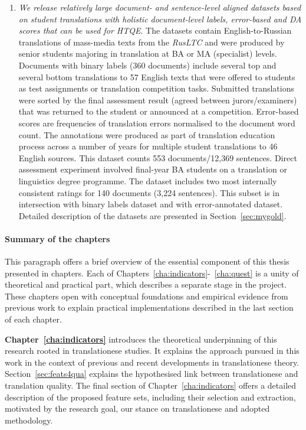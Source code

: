 \begin{enumerate}
	\item \textit{We release relatively large document- and sentence-level aligned datasets based on student translations with holistic document-level labels, error-based and DA scores that can be used for \gls{HTQE}}.
	The datasets contain English-to-Russian translations of mass-media texts from the \textit{RusLTC} and were produced by senior students majoring in translation at BA or MA (specialist) levels. 
	Documents with binary labels (360 documents) include several top and several bottom translations to 57 English texts that were offered to students as test assignments or translation competition tasks. Submitted translations were sorted by the final assessment result (agreed between jurors/examiners) that was returned to the student or announced at a competition.
	Error-based scores are frequencies of translation errors normalised to the document word count. The annotations were produced as part of translation education process across a number of years for multiple student translations to 46 English sources. This dataset counts 553 documents/12,369 sentences.
	Direct assessment experiment involved final-year BA students on a translation or linguistics degree programme. The dataset includes two most internally consistent ratings for 140 documents (3,224 sentences). This subset is in intersection with binary labels dataset and with error-annotated dataset.
	Detailed description of the datasets are presented in Section~\ref{sec:mygold}.
	
\end{enumerate}

\paragraph{Summary of the chapters}
This paragraph offers a brief overview of the essential component of this thesis presented in chapters.
Each of Chapters~\ref{cha:indicators}-~\ref{cha:quest} is a unity of theoretical and practical part, which describes a separate stage in the project. These chapters open with conceptual foundations and empirical evidence from previous work to explain practical implementations described in the last section of each chapter. 

\textbf{Chapter~\ref{cha:indicators}} introduces the theoretical underpinning of this research rooted in translationese studies. It explains the approach pursued in this work in the context of previous and recent developments in translationese theory.
Section~\ref{sec:feats4qua} explains the hypothesised link between translationese and translation quality. The final section of Chapter~\ref{cha:indicators} offers a detailed description of the proposed feature sets, including their selection and extraction, motivated by the research goal, our stance on translationese and adopted methodology.

